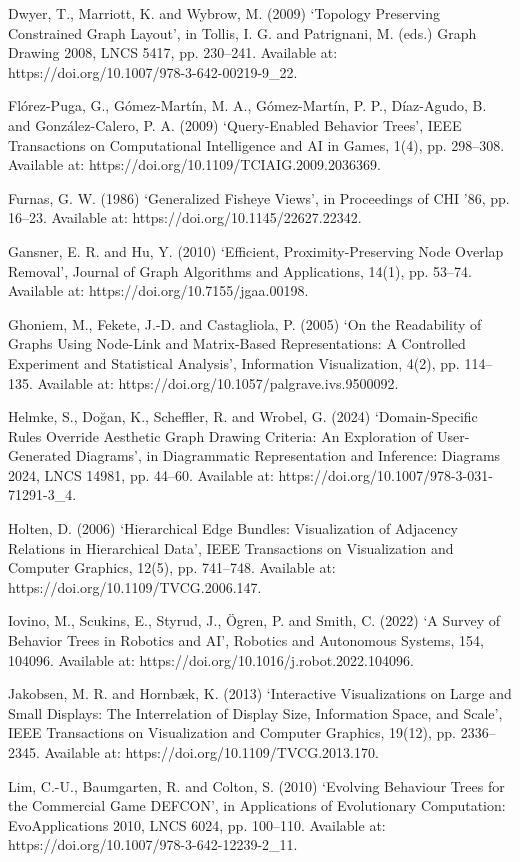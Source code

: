 Dwyer, T., Marriott, K. and Wybrow, M. (2009) ‘Topology Preserving Constrained Graph Layout’, in Tollis, I. G. and Patrignani, M. (eds.) Graph Drawing 2008, LNCS 5417, pp. 230–241. Available at: https://doi.org/10.1007/978-3-642-00219-9\_22.

Flórez-Puga, G., Gómez-Martín, M. A., Gómez-Martín, P. P., Díaz-Agudo, B. and González-Calero, P. A. (2009) ‘Query-Enabled Behavior Trees’, IEEE Transactions on Computational Intelligence and AI in Games, 1(4), pp. 298–308. Available at: https://doi.org/10.1109/TCIAIG.2009.2036369.

Furnas, G. W. (1986) ‘Generalized Fisheye Views’, in Proceedings of CHI ’86, pp. 16–23. Available at: https://doi.org/10.1145/22627.22342.

Gansner, E. R. and Hu, Y. (2010) ‘Efficient, Proximity-Preserving Node Overlap Removal’, Journal of Graph Algorithms and Applications, 14(1), pp. 53–74. Available at: https://doi.org/10.7155/jgaa.00198.

Ghoniem, M., Fekete, J.-D. and Castagliola, P. (2005) ‘On the Readability of Graphs Using Node-Link and Matrix-Based Representations: A Controlled Experiment and Statistical Analysis’, Information Visualization, 4(2), pp. 114–135. Available at: https://doi.org/10.1057/palgrave.ivs.9500092.

Helmke, S., Doğan, K., Scheffler, R. and Wrobel, G. (2024) ‘Domain-Specific Rules Override Aesthetic Graph Drawing Criteria: An Exploration of User-Generated Diagrams’, in Diagrammatic Representation and Inference: Diagrams 2024, LNCS 14981, pp. 44–60. Available at: https://doi.org/10.1007/978-3-031-71291-3\_4.

Holten, D. (2006) ‘Hierarchical Edge Bundles: Visualization of Adjacency Relations in Hierarchical Data’, IEEE Transactions on Visualization and Computer Graphics, 12(5), pp. 741–748. Available at: https://doi.org/10.1109/TVCG.2006.147.

Iovino, M., Scukins, E., Styrud, J., Ögren, P. and Smith, C. (2022) ‘A Survey of Behavior Trees in Robotics and AI’, Robotics and Autonomous Systems, 154, 104096. Available at: https://doi.org/10.1016/j.robot.2022.104096.

Jakobsen, M. R. and Hornbæk, K. (2013) ‘Interactive Visualizations on Large and Small Displays: The Interrelation of Display Size, Information Space, and Scale’, IEEE Transactions on Visualization and Computer Graphics, 19(12), pp. 2336–2345. Available at: https://doi.org/10.1109/TVCG.2013.170.

Lim, C.-U., Baumgarten, R. and Colton, S. (2010) ‘Evolving Behaviour Trees for the Commercial Game DEFCON’, in Applications of Evolutionary Computation: EvoApplications 2010, LNCS 6024, pp. 100–110. Available at: https://doi.org/10.1007/978-3-642-12239-2\_11.

